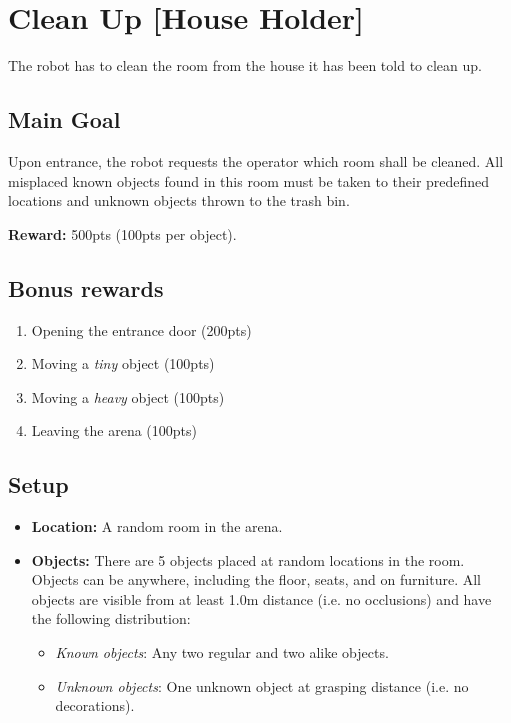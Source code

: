 \section{Clean Up [House Holder]}
The robot has to clean the room from the house it has been told to clean up.


\subsection{Main Goal}
Upon entrance, the robot requests the operator which room shall be cleaned.
All misplaced known objects found in this room must be taken to their predefined locations and unknown objects thrown to the trash bin.

\noindent\textbf{Reward:} 500pts (100pts per object).

\subsection{Bonus rewards}
\begin{enumerate}[nosep]
	\item Opening the entrance door (200pts)
	\item Moving a \emph{tiny} object (100pts)
	\item Moving a \emph{heavy} object (100pts)
	\item Leaving the arena (100pts)
\end{enumerate}


\subsection{Setup}
\begin{itemize}[nosep]
	\item \textbf{Location:} A random room in the arena.

	\item \textbf{Objects:} There are 5 objects placed at random locations in the room.
	Objects can be anywhere, including the floor, seats, and on furniture.
	All objects are visible from at least 1.0m distance (i.e. no occlusions) and have the following distribution:
	\begin{itemize}[nosep]
		\item\textit{Known objects}: Any two regular and two alike objects.
		\item\textit{Unknown objects}: One unknown object at grasping distance (i.e. no decorations).
	\end{itemize}
\end{itemize}

